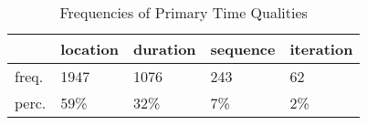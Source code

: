\begin{table}[htbp!]
\centering
\caption{Frequencies of Primary Time Qualities}
\label{table:qual_counts}
\begin{tabular}{lllll}
\toprule
{} & location & duration & sequence & iteration \\
\midrule
freq. &     1947 &     1076 &      243 &        62 \\
perc. &      59\% &      32\% &       7\% &        2\% \\
\bottomrule
\end{tabular}
\end{table}

